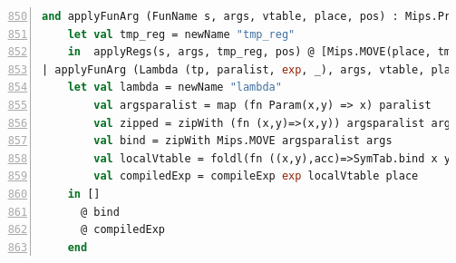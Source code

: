 \documentclass[11pt]{article}
\begin{document}
 \begin{lstlisting}[language=ML,basicstyle=\footnotesize,caption={Lambda in CodeGen.sml },firstnumber=850,breaklines=false,numbers=left]
and applyFunArg (FunName s, args, vtable, place, pos) : Mips.Prog =
    let val tmp_reg = newName "tmp_reg"
    in  applyRegs(s, args, tmp_reg, pos) @ [Mips.MOVE(place, tmp_reg)] end
| applyFunArg (Lambda (tp, paralist, exp, _), args, vtable, place, pos) =
    let val lambda = newName "lambda"
        val argsparalist = map (fn Param(x,y) => x) paralist 
        val zipped = zipWith (fn (x,y)=>(x,y)) argsparalist args
        val bind = zipWith Mips.MOVE argsparalist args
        val localVtable = foldl(fn ((x,y),acc)=>SymTab.bind x y acc) (SymTab.empty()) zipped
        val compiledExp = compileExp exp localVtable place
    in []
      @ bind
      @ compiledExp
    end
\end{lstlisting}
\end{document}
